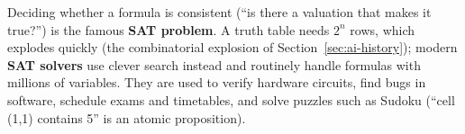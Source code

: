 \begin{nbwhy}
Deciding whether a formula is consistent (``is there a valuation that makes it true?'') is
the famous \textbf{SAT problem}. A truth table needs $2^n$ rows, which explodes quickly
(the combinatorial explosion of Section~\ref{sec:ai-history}); modern \textbf{SAT solvers}
use clever search instead and routinely handle formulas with millions of variables. They
are used to verify hardware circuits, find bugs in software, schedule exams and timetables,
and solve puzzles such as Sudoku (``cell (1,1) contains 5'' is an atomic proposition).
\end{nbwhy}
